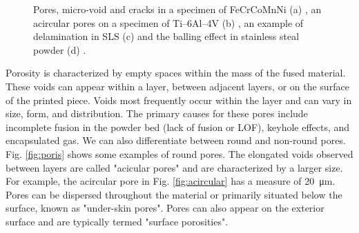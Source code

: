 \begin{figure}
{    }
    \qquad
    \qquad
    \caption[Defect examples in PBF.]{Pores, micro-void and cracks in a specimen of FeCrCoMnNi (a) \cite{mostafaei_defects_2022}, an acircular pores on a specimen of Ti–6Al–4V (b) \cite{tammas-williams_xct_2015}, an example of delamination in SLS (c) \cite{sames_metallurgy_2016} and the balling effect in stainless steal powder (d) \cite{li_balling_2012}.}
\end{figure} 
Porosity is characterized by empty spaces within the mass of the fused material. These voids can appear within a layer, between adjacent layers, or on the surface of the printed piece. Voids most frequently occur within the layer and can vary in size, form, and distribution. The primary causes for these pores include incomplete fusion in the powder bed (lack of fusion or LOF), keyhole effects, and encapsulated gas. We can also differentiate between round and non-round pores. Fig. \ref{fig:poris} shows some examples of round pores. The elongated voids observed between layers are called "acicular pores" and are characterized by a larger size. For example, the acircular pore in Fig. \ref{fig:acircular} has a measure of \SI{20}{\micro\metre}. Pores can be dispersed throughout the material or primarily situated below the surface, known as "under-skin pores". Pores can also appear on the exterior surface and are typically termed "surface porosities".

